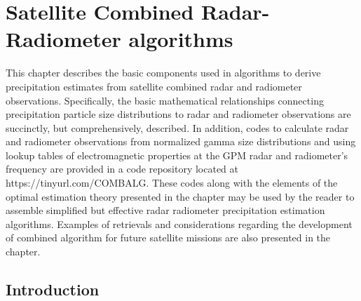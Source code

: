 \documentclass[10pt]{ietbook}
\begin{document}

\markboth{}


\chapter{Satellite Combined Radar-Radiometer algorithms}

This chapter describes the basic components used in algorithms to derive precipitation estimates from satellite combined radar and radiometer observations.
Specifically, the basic mathematical relationships connecting precipitation particle size distributions to radar and radiometer observations 
are succinctly, but comprehensively, described.  In addition, codes to calculate radar and radiometer observations from normalized gamma size 
distributions and using lookup tables of electromagnetic properties at the GPM radar and radiometer's frequency are provided in a
code repository located at https://tinyurl.com/COMBALG. These codes along with the elements of the optimal estimation theory presented in the chapter
may be used by the reader to assemble simplified but effective radar radiometer precipitation estimation algorithms.  Examples of retrievals and 
considerations regarding the development of combined algorithm for future satellite missions are also presented in the chapter.


\section{Introduction}
\end{document}
